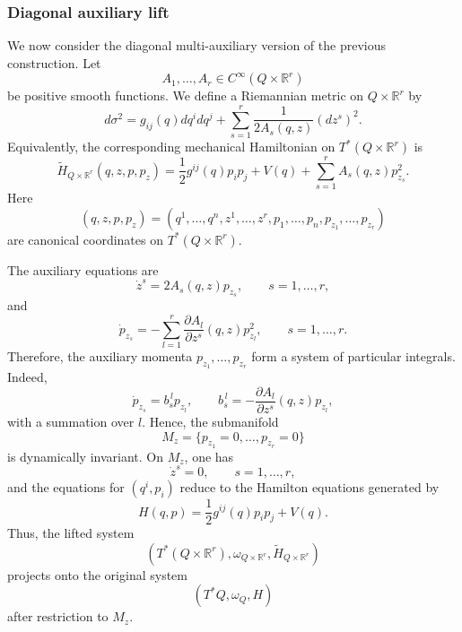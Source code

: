 \documentclass[10pt,a4paper]{article}
\begin{document}
\subsubsection{Diagonal auxiliary lift}

We now consider the diagonal multi-auxiliary version of the previous construction. Let
\[
A_1,\ldots,A_r\in C^\infty(Q\times\mathbb R^r)
\]
be positive smooth functions. We define a Riemannian metric on \(Q\times\mathbb R^r\) by
\begin{equation*}
d\sigma^2
=
g_{ij}(q)dq^idq^j
+
\sum_{s=1}^{r}
\frac{1}{2A_s(q,z)}(dz^s)^2.
\end{equation*}
Equivalently, the corresponding mechanical Hamiltonian on \(T^*(Q\times\mathbb R^r)\) is
\begin{equation*}
\widetilde H_{Q\times\mathbb R^r}(q,z,p,p_z)
=
\frac{1}{2}g^{ij}(q)p_ip_j
+
V(q)
+
\sum_{s=1}^{r}A_s(q,z)p_{z_s}^{2}.
\end{equation*}
Here
\[
(q,z,p,p_z)
=
(q^1,\ldots,q^n,z^1,\ldots,z^r,p_1,\ldots,p_n,p_{z_1},\ldots,p_{z_r})
\]
are canonical coordinates on \(T^*(Q\times\mathbb R^r)\).

The auxiliary equations are
\begin{equation*}
\dot z^s
=
2A_s(q,z)p_{z_s},
\qquad s=1,\ldots,r,
\end{equation*}
and
\begin{equation*}
\dot p_{z_s}
=
-
\sum_{l=1}^{r}
\frac{\partial A_l}{\partial z^s}(q,z)p_{z_l}^{2},
\qquad s=1,\ldots,r.
\end{equation*}
Therefore, the auxiliary momenta \(p_{z_1},\ldots,p_{z_r}\) form a system of particular integrals. Indeed,
\begin{equation*}
\dot p_{z_s}
=
b_s^{\,l}p_{z_l},
\qquad
b_s^{\,l}
=
-
\frac{\partial A_l}{\partial z^s}(q,z)p_{z_l},
\end{equation*}
with a summation over \(l\). Hence, the submanifold
\[
M_z=\{p_{z_1}=0,\ldots,p_{z_r}=0\}
\]
is dynamically invariant. On \(M_z\), one has
\[
\dot z^s=0,\qquad s=1,\ldots,r,
\]
and the equations for \((q^i,p_i)\) reduce to the Hamilton equations generated by
\[
H(q,p)=\frac{1}{2}g^{ij}(q)p_ip_j+V(q).
\]
Thus, the lifted system
\[
\left(T^*(Q\times\mathbb R^r),\omega_{Q\times\mathbb R^r},
\widetilde H_{Q\times\mathbb R^r}\right)
\]
projects onto the original system
\[
(T^*Q,\omega_Q,H)
\]
after restriction to \(M_z\).
\end{document}
